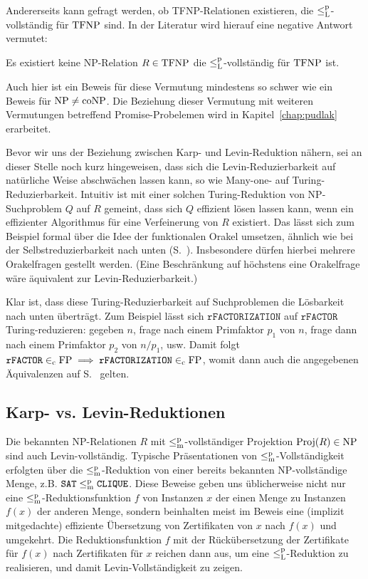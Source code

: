 Andererseits kann gefragt werden, ob TFNP-Relationen existieren, die $\leq_\mathrm{L}^\mathrm{p}$-vollständig für $\mathrm{TFNP}$ sind. In der Literatur \parencite[vgl.][]{pudlak_incompleteness_2017} wird hierauf eine negative Antwort vermutet:
\begin{conjecture}[\hTFNP]
    Es existiert keine NP-Relation $R\in\mathrm{TFNP}$ die $\leq_\mathrm{L}^\mathrm{p}$-vollständig für $\mathrm{TFNP}$ ist.
\end{conjecture}
Auch hier ist ein Beweis für diese Vermutung mindestens so schwer wie ein Beweis für $\mathrm{NP}\neq\mathrm{coNP}$. Die Beziehung dieser Vermutung mit weiteren Vermutungen betreffend Promise-Probelemen wird in Kapitel~\ref{chap:pudlak} erarbeitet.

Bevor wir uns der Beziehung zwischen Karp- und Levin-Reduktion nähern, sei an dieser Stelle noch kurz hingeweisen, dass sich die Levin-Reduzierbarkeit auf natürliche Weise abschwächen lassen kann, so wie Many-one- auf Turing-Reduzierbarkeit. Intuitiv ist mit einer solchen Turing-Reduktion von NP-Suchproblem $Q$ auf $R$ gemeint, dass sich $Q$ effizient lösen lassen kann, wenn ein effizienter Algorithmus für eine Verfeinerung von $R$ existiert. Das lässt sich zum Beispiel formal über die Idee der funktionalen Orakel umsetzen, ähnlich wie bei der Selbstreduzierbarkeit nach unten (S.~\pageref{page:self-reducibility}). Insbesondere dürfen hierbei mehrere Orakelfragen gestellt werden. (Eine Beschränkung auf höchstens eine Orakelfrage wäre äquivalent zur Levin-Reduzierbarkeit.) 

Klar ist, dass diese Turing-Reduzierbarkeit auf Suchproblemen die Lösbarkeit nach unten überträgt. Zum Beispiel lässt sich $\mathtt{rFACTORIZATION}$ auf $\mathtt{rFACTOR}$ Turing-reduzieren: gegeben $n$, frage nach einem Primfaktor $p_1$ von $n$, frage dann nach einem Primfaktor $p_2$ von $n/p_1$, usw. Damit folgt
$\mathtt{rFACTOR}\in_\mathrm{c} \mathrm{FP} \implies \mathtt{rFACTORIZATION}\in_\mathrm{c}\mathrm{FP}$, womit dann auch die angegebenen Äquivalenzen auf S.~\pageref{page:lösbarkeit} gelten. 

\subsection*{Karp- vs. Levin-Reduktionen}

Die bekannten NP-Relationen $R$ mit $\leq_\mathrm{m}^\mathrm{p}$-vollständiger Projektion $\operatorname{Proj}(R)\in\mathrm{NP}$ sind auch Levin-vollständig. Typische Präsentationen von $\leq_\mathrm{m}^\mathrm{p}$-Vollständigkeit erfolgten über die $\leq_\mathrm{m}^\mathrm{p}$-Reduktion von einer bereits bekannten NP-vollständige Menge, z.B. $\mathtt{SAT}\leq_\mathrm{m}^\mathrm{p} \mathtt{CLIQUE}$. Diese Beweise geben uns üblicherweise nicht nur eine $\leq_\mathrm{m}^\mathrm{p}$-Reduktionsfunktion $f$ von Instanzen $x$ der einen Menge zu Instanzen $f(x)$ der anderen Menge, sondern beinhalten meist im Beweis eine (implizit mitgedachte) effiziente Übersetzung von Zertifikaten von $x$ nach $f(x)$ und umgekehrt. 
Die Reduktionsfunktion $f$ mit der Rückübersetzung der  Zertifikate für $f(x)$ nach Zertifikaten für $x$ reichen dann aus, um eine $\leq_\mathrm{L}^\mathrm{p}$-Reduktion zu realisieren, und damit Levin-Vollständigkeit zu zeigen.

